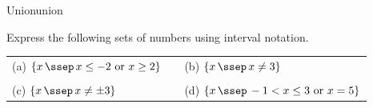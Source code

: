 \begin{example}{Union}{union}
	
Express the following sets of numbers using interval notation.\\
	
	\begin{tabular}{lcl}
			(a) \hspace{2mm}  $\{ x \, \ssep  \, x \leq -2 \, \, \text{or} \, \,  x \geq 2 \}$
			& \hspace{2cm}
			& (b) \hspace{2mm} $\{ x \, \ssep  \, x \neq 3 \}$ \\
			&& \\ [-1em]
			(c) \hspace{2mm} $\{ x \, \ssep  \, x \neq \pm 3 \}$
			&
			&(d) \hspace{2mm} $\{ x \, \ssep  \, -1 < x \leq 3 \,\, \text{or} \,\, x = 5\}$ \\
	\end{tabular} 		
		
\end{example}	

